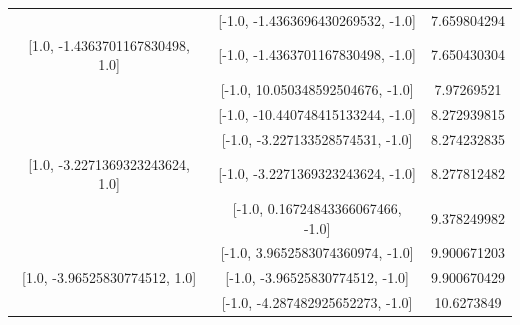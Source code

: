 \documentclass[aps]{revtex4-2}
\begin{document}
\begin{center}
    \begin{tabular}{||c c c||}
        \hline
        [1.0, -1.4363696430269532, 1.0]&[-1.0, -1.4363696430269532, -1.0]&7.659804294\\

        [1.0, -1.4363701167830498, 1.0]&[-1.0, -1.4363701167830498, -1.0]&7.650430304\\
        \hline
        [1.0, 10.050348592504676, 1.0]&[-1.0, 10.050348592504676, -1.0]&7.97269521\\
        \hline
        [1.0, -10.440748415133244, 1.0]&[-1.0, -10.440748415133244, -1.0]&8.272939815\\
        \hline
        [1.0, -3.227133528574531, 1.0]&[-1.0, -3.227133528574531, -1.0]&8.274232835\\

        [1.0, -3.2271369323243624, 1.0]&[-1.0, -3.2271369323243624, -1.0]&8.277812482\\
        \hline
        [1.0, 0.16724843366067466, 1.0]&[-1.0, 0.16724843366067466, -1.0]&9.378249982\\
        \hline
        [1.0, 3.9652583074360974, 1.0]&[-1.0, 3.9652583074360974, -1.0]&9.900671203\\
        
        [1.0, -3.96525830774512, 1.0]&[-1.0, -3.96525830774512, -1.0]&9.900670429\\
        \hline
        [1.0, -4.287482925652273, 1.0]&[-1.0, -4.287482925652273, -1.0]&10.6273849\\
        \hline 
    \end{tabular}
\end{center}
\end{document}
